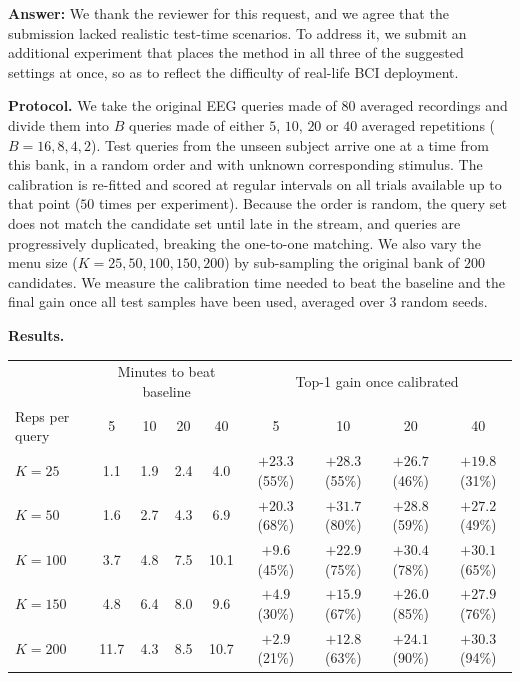 \documentclass[11pt]{article}
\newcommand{\answer}[1]{{\textbf{Answer:} \color{blue} #1}}
\begin{document}
\answer{
We thank the reviewer for this request, and we agree that the submission lacked realistic test-time scenarios. To address it, we submit an additional experiment that places the method in all three of the suggested settings at once, so as to reflect the difficulty of real-life BCI deployment.

\textbf{Protocol.} We take the original EEG queries made of $80$ averaged recordings and divide them
into $B$ queries made of either $5$, $10$, $20$ or $40$ averaged repetitions ($B = 16, 8, 4, 2$). Test queries from the unseen subject arrive one at a time from this bank, in a random order and with unknown corresponding stimulus. The calibration is re-fitted and scored at regular intervals on all trials available up to that point ($50$ times per experiment). Because the order is random, the query set does not match the candidate set until late in the stream, and queries are progressively duplicated, breaking the one-to-one matching. We also vary the menu size ($K = 25, 50, 100, 150, 200$) by sub-sampling the original bank of $200$ candidates. We measure the calibration time needed to beat the baseline and the final gain once all test samples have been used, averaged over $3$ random seeds.

\textbf{Results.}

\begin{center}
\small\setlength{\tabcolsep}{4pt}
\begin{tabular}{lcccc|cccc}
\hline
& \multicolumn{4}{c|}{Minutes to beat baseline} & \multicolumn{4}{c}{Top-1 gain once calibrated} \\
Reps per query & 5 & 10 & 20 & 40 & 5 & 10 & 20 & 40 \\
\hline
$K=25$  & 1.1 & 1.9 & 2.4 & 4.0  & $+23.3$ (55\%) & $+28.3$ (55\%) & $+26.7$ (46\%) & $+19.8$ (31\%) \\
$K=50$  & 1.6 & 2.7 & 4.3 & 6.9  & $+20.3$ (68\%) & $+31.7$ (80\%) & $+28.8$ (59\%) & $+27.2$ (49\%) \\
$K=100$ & 3.7 & 4.8 & 7.5 & 10.1 & $+9.6$ (45\%)  & $+22.9$ (75\%) & $+30.4$ (78\%) & $+30.1$ (65\%) \\
$K=150$ & 4.8 & 6.4 & 8.0 & 9.6  & $+4.9$ (30\%)  & $+15.9$ (67\%) & $+26.0$ (85\%) & $+27.9$ (76\%) \\
$K=200$ & 11.7 & 4.3 & 8.5 & 10.7 & $+2.9$ (21\%) & $+12.8$ (63\%) & $+24.1$ (90\%) & $+30.3$ (94\%) \\
\hline
\end{tabular}
\end{center}

}
\end{document}
